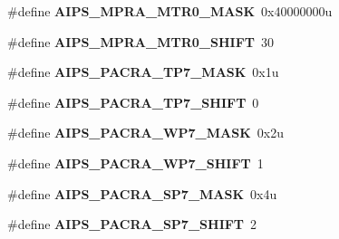 \begin{DoxyCompactItemize}
\item 
\hypertarget{group___a_i_p_s___register___masks_gaa68ee45071324871f38ab8d2afcc6bef}{}\#define {\bfseries A\+I\+P\+S\+\_\+\+M\+P\+R\+A\+\_\+\+M\+T\+R0\+\_\+\+M\+A\+S\+K}~0x40000000u\label{group___a_i_p_s___register___masks_gaa68ee45071324871f38ab8d2afcc6bef}

\item 
\hypertarget{group___a_i_p_s___register___masks_ga15ba628750b5bb7f2ca634208ee31189}{}\#define {\bfseries A\+I\+P\+S\+\_\+\+M\+P\+R\+A\+\_\+\+M\+T\+R0\+\_\+\+S\+H\+I\+F\+T}~30\label{group___a_i_p_s___register___masks_ga15ba628750b5bb7f2ca634208ee31189}

\item 
\hypertarget{group___a_i_p_s___register___masks_ga85e00a1e104ce3b672a6749951d25064}{}\#define {\bfseries A\+I\+P\+S\+\_\+\+P\+A\+C\+R\+A\+\_\+\+T\+P7\+\_\+\+M\+A\+S\+K}~0x1u\label{group___a_i_p_s___register___masks_ga85e00a1e104ce3b672a6749951d25064}

\item 
\hypertarget{group___a_i_p_s___register___masks_ga6a599ee35a806abc0e435a625ba44f92}{}\#define {\bfseries A\+I\+P\+S\+\_\+\+P\+A\+C\+R\+A\+\_\+\+T\+P7\+\_\+\+S\+H\+I\+F\+T}~0\label{group___a_i_p_s___register___masks_ga6a599ee35a806abc0e435a625ba44f92}

\item 
\hypertarget{group___a_i_p_s___register___masks_ga7e6aad69fad0c48d6a05592319a4b6a2}{}\#define {\bfseries A\+I\+P\+S\+\_\+\+P\+A\+C\+R\+A\+\_\+\+W\+P7\+\_\+\+M\+A\+S\+K}~0x2u\label{group___a_i_p_s___register___masks_ga7e6aad69fad0c48d6a05592319a4b6a2}

\item 
\hypertarget{group___a_i_p_s___register___masks_ga28c61707074eb5840c944e3011adbb16}{}\#define {\bfseries A\+I\+P\+S\+\_\+\+P\+A\+C\+R\+A\+\_\+\+W\+P7\+\_\+\+S\+H\+I\+F\+T}~1\label{group___a_i_p_s___register___masks_ga28c61707074eb5840c944e3011adbb16}

\item 
\hypertarget{group___a_i_p_s___register___masks_ga35ee64ee26e93ff99ce92c3fc04032f1}{}\#define {\bfseries A\+I\+P\+S\+\_\+\+P\+A\+C\+R\+A\+\_\+\+S\+P7\+\_\+\+M\+A\+S\+K}~0x4u\label{group___a_i_p_s___register___masks_ga35ee64ee26e93ff99ce92c3fc04032f1}

\item 
\hypertarget{group___a_i_p_s___register___masks_ga14748ceb093d36b8240822162b70f05d}{}\#define {\bfseries A\+I\+P\+S\+\_\+\+P\+A\+C\+R\+A\+\_\+\+S\+P7\+\_\+\+S\+H\+I\+F\+T}~2\label{group___a_i_p_s___register___masks_ga14748ceb093d36b8240822162b70f05d}


\end{DoxyCompactItemize}
